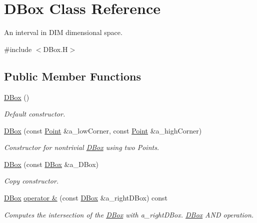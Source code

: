 \hypertarget{class_d_box}{}\section{D\+Box Class Reference}
\label{class_d_box}


An interval in D\+IM dimensional space.  




{\ttfamily \#include $<$D\+Box.\+H$>$}

\subsection*{Public Member Functions}
\begin{DoxyCompactItemize}
\item 
\hyperlink{class_d_box_a8a8c5c7cf3bbfee6ecd3372ced15a540}{D\+Box} ()
\begin{DoxyCompactList}\small\item\em Default constructor. \end{DoxyCompactList}\item 
\mbox{\label{class_d_box_a5e18be35e68713b75e3b938e1d7929fd}} 
\hyperlink{class_d_box_a5e18be35e68713b75e3b938e1d7929fd}{D\+Box} (const \hyperlink{class_point}{Point} \&a\+\_\+low\+Corner, const \hyperlink{class_point}{Point} \&a\+\_\+high\+Corner)
\begin{DoxyCompactList}\small\item\em Constructor for nontrivial \hyperlink{class_d_box}{D\+Box} using two Points. \end{DoxyCompactList}\item 
\mbox{\label{class_d_box_a1b1fa391c33d6fed5f6b0766dc64190b}} 
\hyperlink{class_d_box_a1b1fa391c33d6fed5f6b0766dc64190b}{D\+Box} (const \hyperlink{class_d_box}{D\+Box} \&a\+\_\+\+D\+Box)
\begin{DoxyCompactList}\small\item\em Copy constructor. \end{DoxyCompactList}\item 
\hyperlink{class_d_box}{D\+Box} \hyperlink{class_d_box_a80e097ac4ec5b019d138e07f2d5c22a3}{operator \&} (const \hyperlink{class_d_box}{D\+Box} \&a\+\_\+right\+D\+Box) const
\begin{DoxyCompactList}\small\item\em Computes the intersection of the \hyperlink{class_d_box}{D\+Box} with a\+\_\+right\+D\+Box. \hyperlink{class_d_box}{D\+Box} A\+ND operation. \end{DoxyCompactList}\item 

\end{DoxyCompactItemize}
